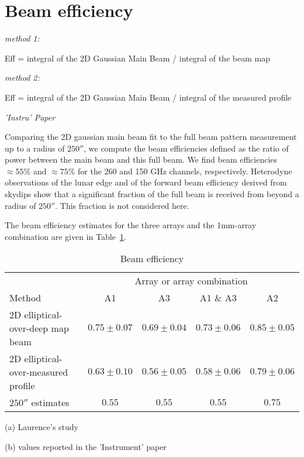 
\section{Beam efficiency}

\noindent \emph{method 1:}

Eff = integral of the 2D Gaussian Main Beam / integral of the beam map

\noindent \emph{method 2:}

Eff = integral of the 2D Gaussian Main Beam / integral of the measured profile

\noindent \emph{'Instru' Paper}

Comparing the 2D gaussian main beam fit to the full beam
pattern measurement up to a radius of $250''$, we compute the
beam efficiencies defined as the ratio of power between the main
beam and this full beam. We find beam efficiencies $\approx 55 \%$
and $\approx 75 \%$ for the 260 and 150 GHz channels, respectively.
Heterodyne observations of the lunar edge and of the forward
beam efficiency derived from skydips show that a significant
fraction of the full beam is received from beyond a radius of
$250''$. This fraction is not considered here.


The beam efficiency estimates for the three arrays and the
1mm-array combination are given in Table~\ref{tab:beam_efficiency}.


\begin{table}[h]
  \caption[]{Beam efficiency}
  \centering
  \begin{threeparttable}
  \begin{tabular}{|l|c|c|c|c|}
    \hline
    
       &    \multicolumn{4}{|c|}{Array or array combination} \\
    \cline{2-5}
    Method & A1 &  A3 & A1 $\&$ A3 &  A2  \\
    \hline
    \hline
    2D elliptical-over-deep map beam\tnote{a} &  $0.75 \pm 0.07$  &
    $0.69 \pm 0.04$  &  $0.73 \pm 0.06$  &  $0.85 \pm 0.05$  \\
    2D elliptical-over-measured profile\tnote{a} &  $0.63 \pm 0.10$  &
    $0.56 \pm 0.05$  &  $0.58 \pm 0.06$  &  $0.79 \pm 0.06$  \\
    $250''$ estimates\tnote{b}    &  $0.55$  &   $0.55$ &   $0.55$ &  $0.75$  \\
    \hline
  \end{tabular}
  \begin{tablenotes}
  \item[(a)] Laurence's study
  \item[(b)] values reported in the 'Instrument' paper
  \end{tablenotes}
  \end{threeparttable}
  \label{tab:beam_efficiency}
\end{table}




